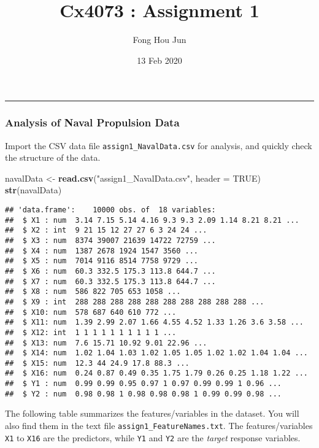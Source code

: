 \documentclass[
]{article}
\title{Cx4073 : Assignment 1}
\author{Fong Hou Jun}
\date{13 Feb 2020}
\newenvironment{Shaded}{\begin{snugshade}}{\end{snugshade}}
\newcommand{\DataTypeTok}[1]{\textcolor[rgb]{0.13,0.29,0.53}{#1}}
\newcommand{\KeywordTok}[1]{\textcolor[rgb]{0.13,0.29,0.53}{\textbf{#1}}}
\newcommand{\NormalTok}[1]{#1}
\newcommand{\OtherTok}[1]{\textcolor[rgb]{0.56,0.35,0.01}{#1}}
\newcommand{\StringTok}[1]{\textcolor[rgb]{0.31,0.60,0.02}{#1}}
\begin{document}
\maketitle

\begin{center}\rule{0.5\linewidth}{0.5pt}\end{center}

\hypertarget{analysis-of-naval-propulsion-data}{%
\subsubsection{Analysis of Naval Propulsion
Data}\label{analysis-of-naval-propulsion-data}}

Import the CSV data file \texttt{assign1\_NavalData.csv} for analysis,
and quickly check the structure of the data.

\begin{Shaded}
\begin{Highlighting}[]
\NormalTok{navalData <-}\StringTok{ }\KeywordTok{read.csv}\NormalTok{(}\StringTok{"assign1_NavalData.csv"}\NormalTok{, }\DataTypeTok{header =} \OtherTok{TRUE}\NormalTok{)}
\KeywordTok{str}\NormalTok{(navalData)}
\end{Highlighting}
\end{Shaded}

\begin{verbatim}
## 'data.frame':    10000 obs. of  18 variables:
##  $ X1 : num  3.14 7.15 5.14 4.16 9.3 9.3 2.09 1.14 8.21 8.21 ...
##  $ X2 : int  9 21 15 12 27 27 6 3 24 24 ...
##  $ X3 : num  8374 39007 21639 14722 72759 ...
##  $ X4 : num  1387 2678 1924 1547 3560 ...
##  $ X5 : num  7014 9116 8514 7758 9729 ...
##  $ X6 : num  60.3 332.5 175.3 113.8 644.7 ...
##  $ X7 : num  60.3 332.5 175.3 113.8 644.7 ...
##  $ X8 : num  586 822 705 653 1058 ...
##  $ X9 : int  288 288 288 288 288 288 288 288 288 288 ...
##  $ X10: num  578 687 640 610 772 ...
##  $ X11: num  1.39 2.99 2.07 1.66 4.55 4.52 1.33 1.26 3.6 3.58 ...
##  $ X12: int  1 1 1 1 1 1 1 1 1 1 ...
##  $ X13: num  7.6 15.71 10.92 9.01 22.96 ...
##  $ X14: num  1.02 1.04 1.03 1.02 1.05 1.05 1.02 1.02 1.04 1.04 ...
##  $ X15: num  12.3 44 24.9 17.8 88.3 ...
##  $ X16: num  0.24 0.87 0.49 0.35 1.75 1.79 0.26 0.25 1.18 1.22 ...
##  $ Y1 : num  0.99 0.99 0.95 0.97 1 0.97 0.99 0.99 1 0.96 ...
##  $ Y2 : num  0.98 0.98 1 0.98 0.98 0.98 1 0.99 0.99 0.98 ...
\end{verbatim}

The following table summarizes the features/variables in the dataset.
You will also find them in the text file
\texttt{assign1\_FeatureNames.txt}. The features/variables \texttt{X1}
to \texttt{X16} are the predictors, while \texttt{Y1} and \texttt{Y2}
are the \emph{target} response variables.
\end{document}
